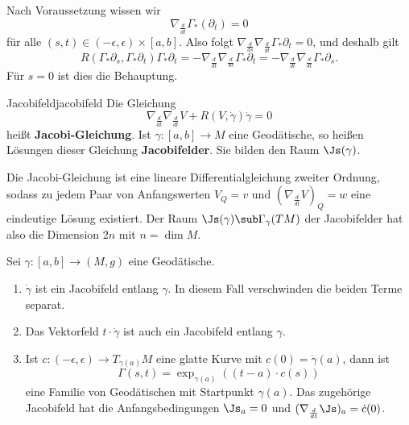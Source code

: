 \begin{beweis}
Nach Voraussetzung wissen wir
\begin{equation}
\nabla_\frac{d}{dt} \Gamma_\ast (\partial_t)=0
\end{equation}
für alle $(s,t)\in (-\epsilon, \epsilon) \times [a,b]$. Also folgt $\nabla_\frac{d}{ds} \nabla_\frac{d}{dt} \Gamma_\ast \partial_t = 0$, und deshalb gilt 
\begin{equation}
R(\Gamma_\ast \partial_s, \Gamma_\ast \partial_t)\Gamma_\ast \partial_t = - \nabla_\frac{d}{dt} \nabla_\frac{d}{ds} \Gamma_\ast \partial_t = - \nabla_\frac{d}{dt} \nabla_\frac{d}{dt} \Gamma_\ast \partial_s.
\end{equation}
Für $s=0$ ist dies die Behauptung.
\end{beweis}
\begin{definition}{Jacobifeld}{jacobifeld}
Die Gleichung 
\begin{equation}
\nabla_\frac{d}{dt} \nabla_\frac{d}{dt} V + R(V, \dot{\gamma})\dot{\gamma}=0
\end{equation}
heißt \textbf{Jacobi-Gleichung}. Ist $\gamma: [a,b] \to M$ eine Geodätische, so heißen Lösungen dieser Gleichung \textbf{Jacobifelder}. Sie bilden den Raum $\Js(\gamma)$. 
\end{definition}
Die Jacobi-Gleichung ist eine lineare Differentialgleichung zweiter Ordnung, sodass zu jedem Paar von Anfangswerten $V_Q=v$ und $(\nabla_\frac{d}{dt} V)_Q = w$ eine eindeutige Lösung existiert. Der Raum $\Js (\gamma) \sub \Gamma_\gamma(TM)$ der Jacobifelder hat also die Dimension $2n$ mit $n = \dim M$.
\begin{beispiele}
Sei $\gamma: [a,b] \to (M,g)$ eine Geodätische.
\begin{enumerate}
\item $\dot{\gamma}$ ist ein Jacobifeld entlang $\gamma$. In diesem Fall verschwinden die beiden Terme separat.
\item Das Vektorfeld $t \cdot \dot{\gamma}$ ist auch ein Jacobifeld entlang $\gamma$.
\item Ist $c: (-\epsilon, \epsilon) \to T_{\gamma(a)}M$ eine glatte Kurve mit $c(0)=\dot{\gamma}(a)$, dann ist 
\begin{equation}
\Gamma(s,t) = \exp_{\gamma(a)}((t-a) \cdot c(s))
\end{equation}
eine Familie von Geodätischen mit Startpunkt $\gamma(a)$. Das zugehörige Jacobifeld hat die Anfangsbedingungen $\Js_a=0$ und $(\nabla_\frac{d}{dt} \Js)_a = \dot{c}(0)$.
\end{enumerate}
\end{beispiele}

